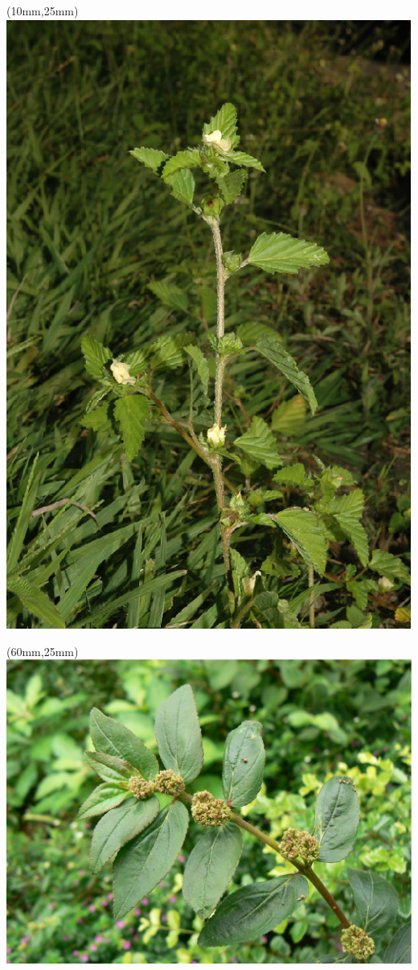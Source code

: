 \documentclass[10pt]{beamer}
\begin{document}
\begin{frame}
\begin{textblock*}{40mm}(10mm,25mm)
			\includegraphics[width=\linewidth]{Feathergraphics/Malvastrum_coromancalianum_L.eps}
\end{textblock*}
\begin{textblock*}{60mm}(60mm,25mm)
			\includegraphics[width=\linewidth]{Feathergraphics/Euphorbia_geniculata_Ort.eps}
\end{textblock*}	
\end{frame}
\end{document}
